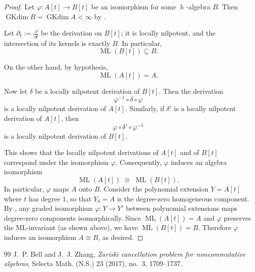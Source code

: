 \documentclass[10pt,a4paper]{amsart}
\DeclareMathOperator{\GKdim}{GKdim}
\DeclareMathOperator{\ML}{ML}
\begin{document}
\begin{proof}
Let $\varphi : A[t] \to B[t]$ be an isomorphism for some $\Bbbk$-algebra $B$.  
Then $\GKdim B = \GKdim A < \infty$ by \cite[Lemma 2.1(2)]{BellZhang2017}.

Let $\partial_t := \frac{\partial}{\partial t}$ be the derivation on $B[t]$; it is locally nilpotent, and the intersection of its kernels is exactly $B$.  
In particular,
\[
    \ML(B[t]) \subseteq B.
\]

On the other hand, by hypothesis,
\[
    \ML(A[t]) = A.
\]

Now let $\delta$ be a locally nilpotent derivation of $B[t]$.  
Then the derivation
\[
    \varphi^{-1} \circ \delta \circ \varphi
\]
is a locally nilpotent derivation of $A[t]$.  
Similarly, if $\delta'$ is a locally nilpotent derivation of $A[t]$, then
\[
    \varphi \circ \delta' \circ \varphi^{-1}
\]
is a locally nilpotent derivation of $B[t]$.

This shows that the locally nilpotent derivations of $A[t]$ and of $B[t]$ correspond under the isomorphism $\varphi$.  
Consequently, $\varphi$ induces an algebra isomorphism
\[
    \ML(A[t]) \;\cong\; \ML(B[t]).
\]
In particular, $\varphi$ maps $A$ onto $B$.
Consider the polynomial extension $Y = A[t]$ where $t$ has degree $1$, so that 
$Y_0 = A$ is the degree-zero homogeneous component. By 
\cite[Lemma 3.2]{BellZhang2017}, any graded isomorphism $\varphi: Y \to Y'$ 
between polynomial extensions maps degree-zero components isomorphically. 
Since $\ML(A[t]) = A$ and $\varphi$ preserves the ML-invariant (as shown above), 
we have $\ML(B[t]) = B$. Therefore $\varphi$ induces an isomorphism 
$A \cong B$, as desired.
\end{proof}

\begin{thebibliography}{99}
 J.~P. Bell and J.~J. Zhang, \emph{Zariski cancellation problem for noncommutative algebras}, Selecta Math. (N.S.) 23 (2017), no.~3, 1709--1737. %
\end{thebibliography}
\end{document}

